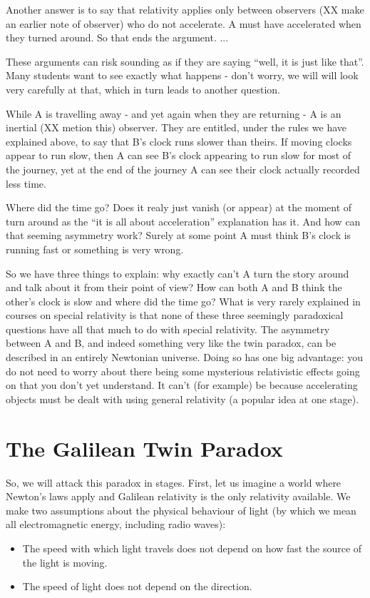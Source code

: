 \documentclass{report}
\begin{document}
Another answer is to say that relativity applies only between observers (XX make an earlier note of observer) who do not accelerate. A must have accelerated when they turned around. So that ends the argument. ...

These arguments can risk sounding as if they are saying ``well, it is just like that''. Many students want to see exactly what happens - don't worry, we will will look very carefully at that, which in turn leads to another question.

While A is travelling away - and yet again when they are returning - A is an inertial (XX metion this) observer. They are entitled, under the rules we have explained above, to say that B's clock runs slower than theirs. If moving clocks appear to run slow, then A can see B's clock appearing to run slow for most of the journey, yet at the end of the journey A can see their clock actually recorded less time.

Where did the time go? Does it realy just vanish (or appear) at the moment of turn around as the ``it is all about acceleration'' explanation has it.  And how can that seeming asymmetry work? Surely at some point A must think B's clock is running fast or something is very wrong.

So we have three things to explain: why exactly can't A turn the story around and talk about it from their point of view? How can both A and B think the other's clock is slow and where did the time go? What is very rarely explained in courses on special relativity is that none of these three seemingly paradoxical questions have all that much to do with special relativity. The asymmetry between A and B, and indeed something very like the twin paradox, can be described in an entirely Newtonian universe. Doing so has one big advantage: you do not need to worry about there being some mysterious relativistic effects going on that you don't yet understand. It can't (for example) be because accelerating objects must be dealt with using general relativity (a popular idea at one stage).

\section*{The Galilean Twin Paradox}

So, we will attack this paradox in stages. First, let us imagine a world where Newton's laws apply and Galilean relativity is the only relativity available. We make two assumptions about the physical behaviour of light (by which we mean all electromagnetic energy, including radio waves):
\begin{itemize}
\item The speed with which light travels does not depend on how fast the source of the light is moving.
\item The speed of light does not depend on the direction.
\end{itemize}
\end{document}
